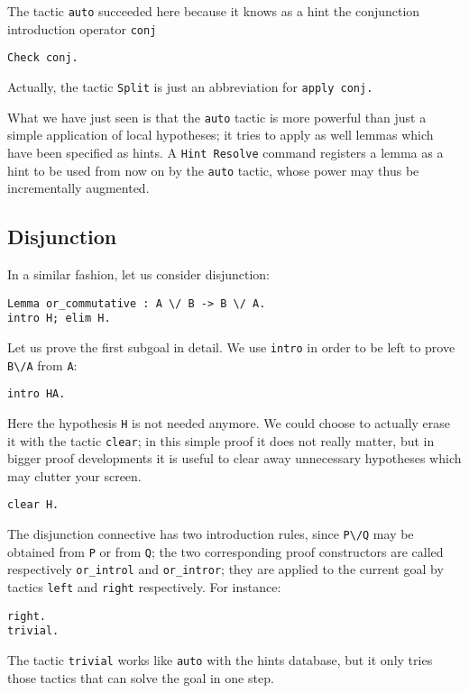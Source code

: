 \documentclass{book}
\begin{document}
The tactic \verb:auto: succeeded here because it knows as a hint the 
conjunction introduction operator \verb+conj+
\begin{lstlisting}
Check conj.
\end{lstlisting}

Actually, the tactic \verb+Split+ is just an abbreviation for \verb+apply conj.+

What we have just seen is that the \verb:auto: tactic is more powerful than
just a simple application of local hypotheses; it tries to apply as well 
lemmas which have been specified as hints. A 
\verb:Hint Resolve: command registers a
lemma as a hint to be used from now on by the \verb:auto: tactic, whose power 
may thus be incrementally augmented.

\subsection{Disjunction}

In a similar fashion, let us consider disjunction:

\begin{lstlisting}
Lemma or_commutative : A \/ B -> B \/ A.
intro H; elim H.
\end{lstlisting}

Let us prove the first subgoal in detail. We use \verb:intro: in order to
be left to prove \verb:B\/A: from \verb:A::

\begin{lstlisting}
intro HA.
\end{lstlisting}

Here the hypothesis \verb:H: is not needed anymore. We could choose to
actually erase it with the tactic \verb:clear:; in this simple proof it
does not really matter, but in bigger proof developments it is useful to
clear away unnecessary hypotheses which may clutter your screen.
\begin{lstlisting}
clear H.
\end{lstlisting}

The disjunction connective has two introduction rules, since \verb:P\/Q:
may be obtained from \verb:P: or from \verb:Q:; the two corresponding
proof constructors are called respectively \verb:or_introl: and
\verb:or_intror:; they are applied to the current goal by tactics
\verb:left: and \verb:right: respectively. For instance:
\begin{lstlisting}
right.
trivial.
\end{lstlisting}
The tactic \verb:trivial: works like \verb:auto: with the hints
database, but it only tries those tactics that can solve the goal in one
step. 
\end{document}
